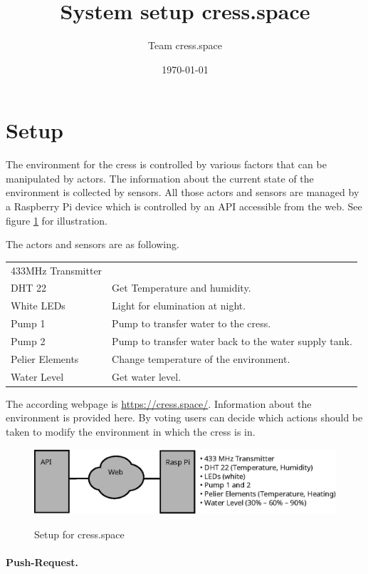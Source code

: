 \documentclass[twocolumn,a4wide,parskip,10pt]{scrartcl}
\title{System setup cress.space}
\date{\today}
\author{Team cress.space}
\begin{document}
\maketitle
\setcounter{page}{1}

\section{Setup}

The environment for the cress is controlled by various factors that
can be manipulated by actors. The information about the current state
of the environment is collected by sensors. All those actors and
sensors are managed by a Raspberry Pi device which is controlled by an
API accessible from the web. See figure \ref{fig:overview_api_raspi}
for illustration.

The actors and sensors are as following.

\begin{tabular}{p{2.5cm}p{4cm}}
  433MHz Transmitter & \\
  DHT 22 & Get Temperature and humidity.\\
  White LEDs & Light for elumination at night.\\
  Pump 1 & Pump to transfer water to the cress.\\
  Pump 2 & Pump to transfer water back to the water supply tank.\\
  Pelier Elements & Change temperature of the environment.\\
  Water Level & Get water level.
\end{tabular}

The according webpage is \url{https://cress.space/}. Information about
the environment is provided here. By voting users can decide which
actions should be taken to modify the environment in which the cress
is in.

\begin{figure}[!h]
  \includegraphics{overview_api_raspi.eps}
  \label{fig:overview_api_raspi}
  \caption{Setup for cress.space}
\end{figure}

\paragraph{Push-Request.}
\end{document}
